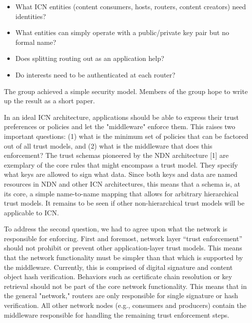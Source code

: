 \documentclass[a4paper,UKenglish]{dagrep}
\begin{document}
\begin{itemize}
\item What ICN entities (content consumers, hosts, routers, content creators) need identities?
\item What entities can simply operate with a public/private key pair but no formal name?
\item Does splitting routing out as an application help?
\item Do interests need to be authenticated at each router? 
\end{itemize}

The group achieved a simple security model. Members of the group hope to write up the result as a short paper.

\license

In an ideal ICN architecture, applications should be able to express their trust preferences or policies and let the "middleware" enforce them. This raises two important questions: (1) what is the minimum set of policies that can be factored out of all trust models, and (2) what is the middleware that does this enforcement? The trust schemas pioneered by the NDN architecture [1] are exemplary of the core rules that might encompass a trust model. They specify what keys are allowed to sign what data. Since both keys and data are named resources in NDN and other ICN architectures, this means that a schema is, at its core, a simple name-to-name mapping that allows for arbitrary hierarchical trust models. It remains to be seen if other non-hierarchical trust models will be applicable to ICN.

To address the second question, we had to agree upon what the network is responsible for enforcing.
First and foremost, network layer ``trust enforcement'' should not prohibit or prevent other application-layer trust models. This means that the network functionality must be simpler than that which is supported by the middleware. Currently, this is comprised of digital signature and content object hash verification. Behaviors such as certificate chain resolution or key retrieval should not be part of the core network functionality. This means that in the general "network," routers are only responsible for single signature or hash verification. All other network nodes (e.g., consumers and producers) contain the middleware responsible for handling the remaining trust enforcement steps.
\end{document}
